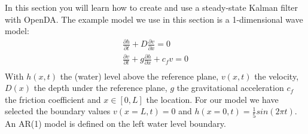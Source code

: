 
  In this section you will learn how to create and use a steady-state Kalman
  filter with OpenDA. The example model we use in this section is a
  1-dimensional wave model:
  \begin{eqnarray}
  \frac{\partial h}{\partial t} + D \frac{\partial v}{\partial x} = 0 \\
  \frac{\partial v}{\partial t} + g \frac{\partial h}{\partial x} + c_f v = 0 \\
  \end{eqnarray}
  With $h(x,t)$ the (water) level above the reference plane, $v(x,t)$ the
  velocity, $D(x)$ the depth under the reference plane, $g$ the gravitational
  acceleration $c_f$ the friction coefficient and $x\in [0,L]$ the location.
  For our model we have selected the boundary values $v(x=L,t)=0$ and
  $h(x=0,t)=\frac{1}{5} sin(2 \pi t)$. An AR(1) model is defined on the left
  water level boundary.

